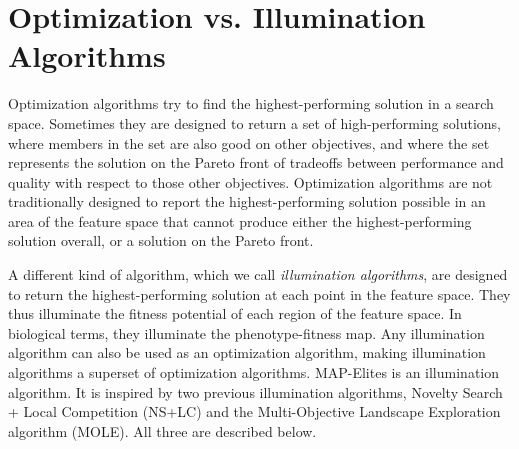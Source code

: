 \documentclass[twocolumn, DIV25, 9pt]{scrartcl}
\begin{document}
\section{Optimization vs. Illumination Algorithms}
\label{illumination}

Optimization algorithms try to find the highest-performing solution in a search space. Sometimes they are designed to return a set of high-performing solutions, where members in the set are also good on other objectives, and where the set represents the solution on the Pareto front of tradeoffs between performance and quality with respect to those other objectives. Optimization algorithms are not traditionally designed to report the highest-performing solution possible in an area of the feature space that cannot produce either the highest-performing solution overall, or a solution on the Pareto front. 

A different kind of algorithm, which we call \emph {illumination algorithms}, are designed to return the highest-performing solution at each point in the feature space. They thus illuminate the fitness potential of each region of the feature space. In biological terms, they illuminate the phenotype-fitness map\cite{bull2011phenotype}. Any illumination algorithm can also be used as an optimization algorithm, making illumination algorithms a superset of optimization algorithms. MAP-Elites is an illumination algorithm. It is inspired by two previous illumination algorithms, Novelty Search + Local Competition (NS+LC)\cite{lehman2011evolving} and the Multi-Objective Landscape Exploration algorithm
(MOLE)\cite{clune2013originModularity}. All three are described below. 
\end{document}
